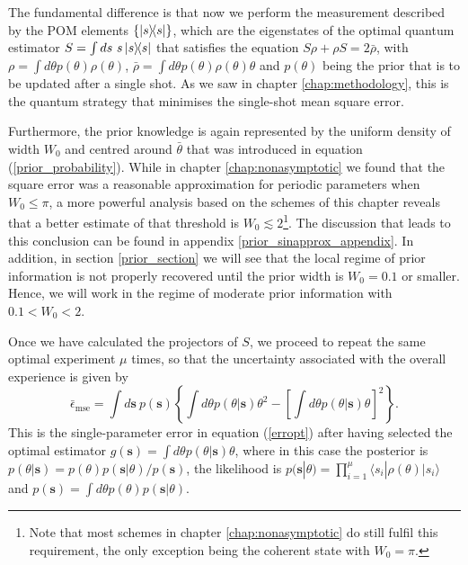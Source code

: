 The fundamental difference is that now we perform the measurement described by the POM elements $\lbrace \ketbra{s}\rbrace$, which are the eigenstates of the optimal quantum estimator $S = \int ds~s\ketbra{s}$ that satisfies the equation $S\rho + \rho S = 2\bar{\rho}$, with $\rho = \int d\theta p(\theta)\rho(\theta)$, $\bar{\rho} = \int d\theta p(\theta)\rho(\theta)\theta$ and $p(\theta)$ being the prior that is to be updated after a single shot. As we saw in chapter \ref{chap:methodology}, this is the quantum strategy that minimises the single-shot mean square error. 

Furthermore, the prior knowledge is again represented by the uniform density of width $W_0$ and centred around $\bar{\theta}$ that was introduced in equation (\ref{prior_probability}). While in chapter \ref{chap:nonasymptotic} we found that the square error was a reasonable approximation for periodic parameters when $W_0 \leqslant \pi$, a more powerful analysis based on the schemes of this chapter  reveals that a better estimate of that threshold is $W_0 \lesssim 2$\footnote{Note that most schemes in chapter \ref{chap:nonasymptotic} do still fulfil this requirement, the only exception being the coherent state with $W_0 = \pi$.}. The discussion that leads to this conclusion can be found in appendix \ref{prior_sinapprox_appendix}. In addition, in section \ref{prior_section} we will see that the local regime of prior information is not properly recovered until the prior width is $W_0 = 0.1$ or smaller. Hence, we will work in the regime of moderate prior information with $0.1<W_0<2$.

Once we have calculated the projectors of $S$, we proceed to repeat the same optimal experiment $\mu$ times, so that the uncertainty associated with the overall experience is given by
\begin{equation}
\bar{\epsilon}_{\mathrm{mse}} = \int d\boldsymbol{s}~p(\boldsymbol{s}) \left\lbrace \int d\theta p(\theta|\boldsymbol{s}) \theta^2 - \left[\int d\theta p(\theta|\boldsymbol{s}) \theta \right]^2 \right\rbrace.
\label{shotbyshotmse}
\end{equation}
This is the single-parameter error in equation (\ref{erropt}) after having selected the optimal estimator $g(\boldsymbol{s}) = \int d\theta p(\theta|\boldsymbol{s}) \theta$, where in this case the posterior is $p(\theta|\boldsymbol{s})= p(\theta) p(\boldsymbol{s}|\theta)/p(\boldsymbol{s})$, the likelihood is $p(\boldsymbol{s}|\theta) = \prod_{i=1}^\mu \langle s_i | \rho(\theta) |s_i \rangle$ and $p(\boldsymbol{s}) = \int d\theta p(\theta)p(\boldsymbol{s}|\theta)$.   

